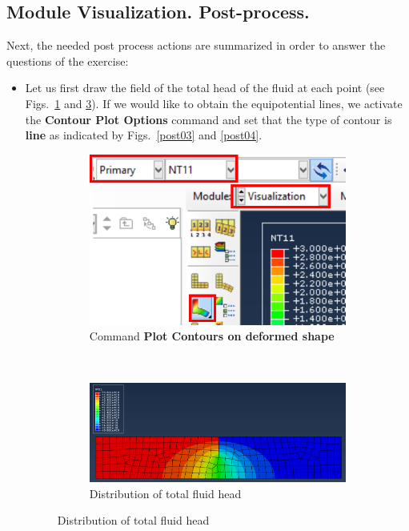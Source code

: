   \subsection{Module Visualization. Post-process.}
  Next, the needed post process actions are summarized in order to
  answer the questions of the exercise:
  \begin{itemize}
  \item Let us first draw the field of the total head of the fluid at
    each point (see Figs.~\ref{post01} and \ref{post02}). If we would
    like to obtain the equipotential lines, we activate the
    \textbf{Contour Plot Options} command and set that the type of
    contour is \textbf{line} as indicated by Figs.~\ref{post03} and
    \ref{post04}.
    \begin{figure}[!h]
      \centering
      \begin{subfigure}[!h]{0.21\textwidth}
        \includegraphics[width=\textwidth]{./body/images/post01.pdf}
        \caption{Command \textbf{Plot Contours on deformed shape}}
        \label{post01}
      \end{subfigure}%
      ~ %
      \begin{subfigure}[!h]{0.60\textwidth}
        \includegraphics[width=\textwidth]{./body/images/post02}
        \caption{Distribution of total fluid head}
        \label{post02}
      \end{subfigure}%


\end{figure}
\end{itemize}
